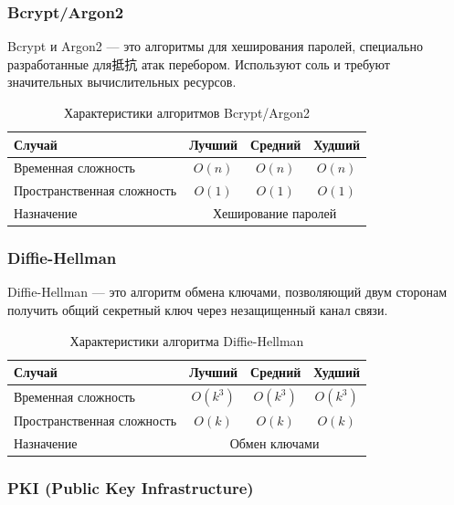 \documentclass[a4paper,12pt]{article}
\begin{document}
\subsubsection{Bcrypt/Argon2}
\label{subsubsec:bcrypt-argon2}

Bcrypt и Argon2 --- это алгоритмы для хеширования паролей, специально разработанные для抵抗 атак перебором. Используют соль и требуют значительных вычислительных ресурсов.

\begin{table}[H]
    \centering
    \begin{tabular}{|l|c|c|c|}
        \hline
        Случай & Лучший & Средний & Худший \\
        \hline
        Временная сложность & $O(n)$ & $O(n)$ & $O(n)$ \\
        \hline
        Пространственная сложность & $O(1)$ & $O(1)$ & $O(1)$ \\
        \hline
        Назначение & \multicolumn{3}{c|}{Хеширование паролей} \\
        \hline
    \end{tabular}
    \caption{Характеристики алгоритмов Bcrypt/Argon2}
\end{table}

\subsubsection{Diffie-Hellman}
\label{subsubsec:diffie-hellman}

Diffie-Hellman --- это алгоритм обмена ключами, позволяющий двум сторонам получить общий секретный ключ через незащищенный канал связи.

\begin{table}[H]
    \centering
    \begin{tabular}{|l|c|c|c|}
        \hline
        Случай & Лучший & Средний & Худший \\
        \hline
        Временная сложность & $O(k^3)$ & $O(k^3)$ & $O(k^3)$ \\
        \hline
        Пространственная сложность & $O(k)$ & $O(k)$ & $O(k)$ \\
        \hline
        Назначение & \multicolumn{3}{c|}{Обмен ключами} \\
        \hline
    \end{tabular}
    \caption{Характеристики алгоритма Diffie-Hellman}
\end{table}

\subsubsection{PKI (Public Key Infrastructure)}
\label{subsubsec:pki-public-key-infrastructure}
\end{document}
